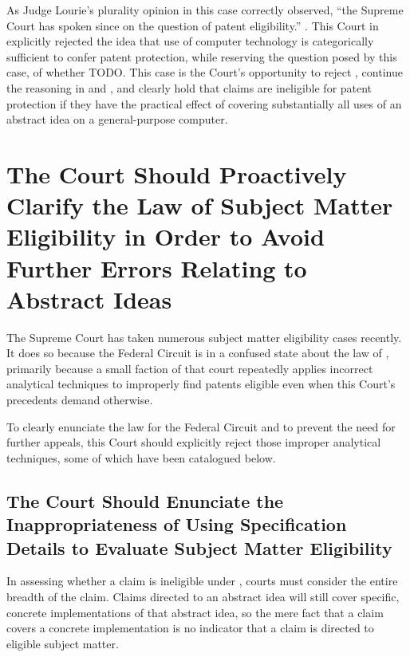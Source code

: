 \documentclass{scotus}
\begin{document}
As Judge Lourie’s plurality opinion in this case correctly observed, “the
Supreme Court has spoken since  on the question of patent
eligibility.”  .  This Court in 
explicitly
rejected the idea that use of computer technology is categorically sufficient to
confer patent protection, while reserving the question posed by this case, of
whether TODO.  This case is the Court’s opportunity to reject ,
continue the reasoning in  and , and clearly hold
that claims are ineligible for patent protection if they have the practical
effect of covering substantially all uses of an abstract idea on a
general-purpose computer.

%



\section{The Court Should Proactively Clarify the Law of Subject Matter
Eligibility in Order to Avoid Further Errors Relating to Abstract Ideas}

The Supreme Court has taken numerous subject matter eligibility cases recently.
It does so because the Federal Circuit is in a confused state about the law of
, primarily because a small faction of that court repeatedly applies
incorrect analytical techniques to improperly find patents eligible even when
this Court's precedents demand otherwise.

To clearly enunciate the law for the Federal Circuit and to prevent the need for
further appeals, this Court should explicitly reject those improper analytical
techniques, some of which have been catalogued below.

\subsection{The Court Should Enunciate the Inappropriateness of Using
Specification Details to Evaluate Subject Matter Eligibility}

In assessing whether a claim is ineligible under , courts must
consider the entire breadth of the claim. Claims directed to an abstract idea
will still cover specific, concrete implementations of that abstract idea, so
the mere fact that a claim covers a concrete implementation is no indicator that
a claim is directed to eligible subject matter.
\end{document}
